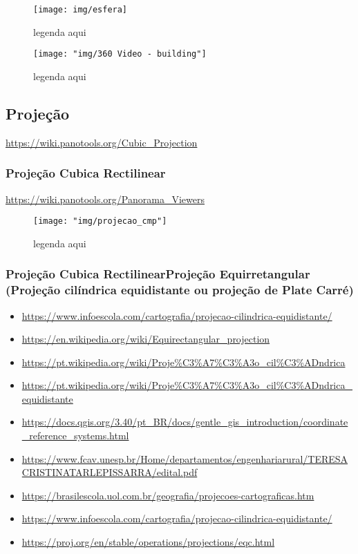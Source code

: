 \begin{figure}[tbh]
	\centering
	\texttt{[image: img/esfera]}
	\caption{legenda aqui}
	\label{fig:esfera}
\end{figure}


\begin{figure}[tbh]
	\centering
	\texttt{[image: "img/360 Video - building"]}
	\caption{legenda aqui}
	\label{fig:building_360_video}
\end{figure}






\subsection{Projeção}
\href{https://wiki.panotools.org/Cubic_Projection}{https://wiki.panotools.org/Cubic\_Projection}

\subsubsection{Projeção Cubica Rectilinear}
\href{https://wiki.panotools.org/Panorama_Viewers}{https://wiki.panotools.org/Panorama\_Viewers}

\begin{figure}[tbh]
	\centering
	\texttt{[image: "img/projecao\_cmp"]}
	\caption{legenda aqui}
	\label{fig:projecao_cmp}
\end{figure}

\subsubsection{Projeção Cubica RectilinearProjeção Equirretangular (Projeção cilíndrica equidistante ou projeção de Plate Carré)}

\begin{itemize}
	\item \url{https://www.infoescola.com/cartografia/projecao-cilindrica-equidistante/}
	\item \url{https://en.wikipedia.org/wiki/Equirectangular_projection}
	\item \url{https://pt.wikipedia.org/wiki/Proje%C3%A7%C3%A3o_cil%C3%ADndrica}
	\item \url{https://pt.wikipedia.org/wiki/Proje%C3%A7%C3%A3o_cil%C3%ADndrica_equidistante}
	\item \url{https://docs.qgis.org/3.40/pt_BR/docs/gentle_gis_introduction/coordinate_reference_systems.html}
	\item \url{https://www.fcav.unesp.br/Home/departamentos/engenhariarural/TERESACRISTINATARLEPISSARRA/edital.pdf}
	\item \url{https://brasilescola.uol.com.br/geografia/projecoes-cartograficas.htm}
	\item \url{https://www.infoescola.com/cartografia/projecao-cilindrica-equidistante/}
	\item \url{https://proj.org/en/stable/operations/projections/eqc.html}	
\end{itemize}

